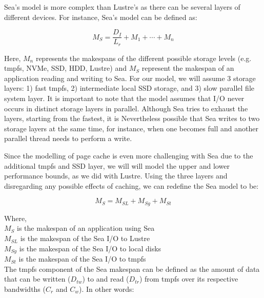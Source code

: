 \documentclass[10pt,journal,compsoc]{IEEEtran}
\begin{document}
      Sea's model is more complex than Lustre's as there can be several layers
      of different devices. For instance, Sea's model can be defined as:

      \begin{equation}\label{eq:sea-comp:sea}
          M_{S} = \frac{D_{I}}{L_{r}} + M_{1} + \cdots + M_{n}
      \end{equation}

      Here, $M_{n}$ represents the makespans of the different possible storage
      levels (e.g. tmpfs, NVMe, SSD, HDD, Lustre) and $M_{S}$ represent the
      makespan of an application reading and writing to Sea. For our model, we
      will assume 3 storage layers: 1) fast tmpfs, 2) intermediate local SSD
      storage, and 3) slow parallel file system layer. It is important to note that
      the model assumes that I/O never occurs in distinct storage layers in parallel.
      Although Sea tries to exhaust the layers, starting from the fastest, it is Nevertheless
      possible that Sea writes to two storage layers at the same time, for instance, when one becomes full
      and another parallel thread needs to perform a write.

      Since the modelling of page cache is even more challenging with Sea due to
      the additional tmpfs and SSD layer, we will will model the upper and lower
      performance bounds, as we did with Lustre. Using the three layers and
      disregarding any possible effects of caching, we can redefine the Sea
      model to be:

      \begin{equation}\label{eq:sea-comp:snc}
          M_{S} = M_{SL} + M_{Sg} + M_{St}
      \end{equation}

      Where, \\
      $M_{S}$ is the makespan of an application using Sea \\
      $M_{SL}$ is the makespan of the Sea I/O to Lustre \\
      $M_{Sg}$ is the makespan of the Sea I/O to local disks \\
      $M_{St}$ is the makespan of the Sea I/O to tmpfs \\



      The tmpfs component of the Sea makespan can be defined as the amount of
      data that can be written ($D_{tw}$) to and read ($D_{tr}$) from tmpfs over
      its respective bandwidths ($C_{r}$ and $C_{w}$). In other words:
\end{document}
